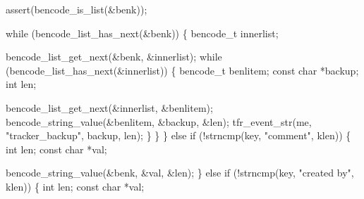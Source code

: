 \documentclass[
  a4paper,
]{scrreprt}
\newenvironment{Shaded}{\begin{snugshade}}{\end{snugshade}}
\newcommand{\ControlFlowTok}[1]{\textcolor[rgb]{0.85,0.12,0.09}{#1}}
\newcommand{\DataTypeTok}[1]{\textcolor[rgb]{0.47,0.16,0.63}{#1}}
\newcommand{\NormalTok}[1]{\textcolor[rgb]{0.33,0.33,0.33}{#1}}
\newcommand{\OperatorTok}[1]{\textcolor[rgb]{0.00,0.46,0.62}{#1}}
\newcommand{\StringTok}[1]{\textcolor[rgb]{0.00,0.50,0.00}{#1}}
\theoremstyle{definition}
\theoremstyle{remark}
\begin{document}
\begin{Shaded}
\begin{Highlighting}[numbers=left,,]
\NormalTok{            assert}\OperatorTok{(}\NormalTok{bencode\_is\_list}\OperatorTok{(\&}\NormalTok{benk}\OperatorTok{));}

            \ControlFlowTok{while} \OperatorTok{(}\NormalTok{bencode\_list\_has\_next}\OperatorTok{(\&}\NormalTok{benk}\OperatorTok{))}
            \OperatorTok{\{}
\NormalTok{                bencode\_t innerlist}\OperatorTok{;}

\NormalTok{                bencode\_list\_get\_next}\OperatorTok{(\&}\NormalTok{benk}\OperatorTok{,} \OperatorTok{\&}\NormalTok{innerlist}\OperatorTok{);}
                \ControlFlowTok{while} \OperatorTok{(}\NormalTok{bencode\_list\_has\_next}\OperatorTok{(\&}\NormalTok{innerlist}\OperatorTok{))}
                \OperatorTok{\{}
\NormalTok{                    bencode\_t benlitem}\OperatorTok{;}
                    \DataTypeTok{const} \DataTypeTok{char} \OperatorTok{*}\NormalTok{backup}\OperatorTok{;}
                    \DataTypeTok{int}\NormalTok{ len}\OperatorTok{;}

\NormalTok{                    bencode\_list\_get\_next}\OperatorTok{(\&}\NormalTok{innerlist}\OperatorTok{,} \OperatorTok{\&}\NormalTok{benlitem}\OperatorTok{);}
\NormalTok{                    bencode\_string\_value}\OperatorTok{(\&}\NormalTok{benlitem}\OperatorTok{,} \OperatorTok{\&}\NormalTok{backup}\OperatorTok{,} \OperatorTok{\&}\NormalTok{len}\OperatorTok{);}
\NormalTok{                    tfr\_event\_str}\OperatorTok{(}\NormalTok{me}\OperatorTok{,} \StringTok{"tracker\_backup"}\OperatorTok{,}\NormalTok{ backup}\OperatorTok{,}\NormalTok{ len}\OperatorTok{);}
                \OperatorTok{\}}
            \OperatorTok{\}}
        \OperatorTok{\}}
        \ControlFlowTok{else} \ControlFlowTok{if} \OperatorTok{(!}\NormalTok{strncmp}\OperatorTok{(}\NormalTok{key}\OperatorTok{,} \StringTok{"comment"}\OperatorTok{,}\NormalTok{ klen}\OperatorTok{))}
        \OperatorTok{\{}
            \DataTypeTok{int}\NormalTok{ len}\OperatorTok{;}
            \DataTypeTok{const} \DataTypeTok{char} \OperatorTok{*}\NormalTok{val}\OperatorTok{;}

\NormalTok{            bencode\_string\_value}\OperatorTok{(\&}\NormalTok{benk}\OperatorTok{,} \OperatorTok{\&}\NormalTok{val}\OperatorTok{,} \OperatorTok{\&}\NormalTok{len}\OperatorTok{);}
        \OperatorTok{\}}
        \ControlFlowTok{else} \ControlFlowTok{if} \OperatorTok{(!}\NormalTok{strncmp}\OperatorTok{(}\NormalTok{key}\OperatorTok{,} \StringTok{"created by"}\OperatorTok{,}\NormalTok{ klen}\OperatorTok{))}
        \OperatorTok{\{}
            \DataTypeTok{int}\NormalTok{ len}\OperatorTok{;}
            \DataTypeTok{const} \DataTypeTok{char} \OperatorTok{*}\NormalTok{val}\OperatorTok{;}


\end{Highlighting}
\end{Shaded}
\end{document}
